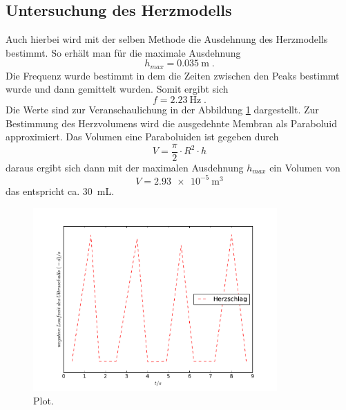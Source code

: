 \subsection{Untersuchung des Herzmodells}
Auch hierbei wird mit der selben Methode die Ausdehnung des Herzmodells
bestimmt. So erhält man für die maximale Ausdehnung
\begin{equation*}
  h_{max} = \SI{0.035}{\meter} \; .
\end{equation*}
Die Frequenz wurde bestimmt in dem die Zeiten zwischen den Peaks bestimmt wurde
und dann gemittelt wurden. Somit ergibt sich
\begin{equation*}
  f = \SI{2.23}{\hertz}\;.
\end{equation*}
Die Werte sind zur Veranschaulichung in der Abbildung \ref{fig:Hp} dargestellt.
Zur Bestimmung des Herzvolumens wird die ausgedehnte Membran als Paraboluid
approximiert. Das Volumen eine Paraboluiden ist gegeben durch
\begin{equation*}
  V = \frac{\pi}{2} \cdot R^2 \cdot h
\end{equation*}
daraus ergibt sich dann mit der maximalen Ausdehnung $h_{max}$ ein Volumen von
\begin{equation*}
  V = \SI{2.93e-5}{\cubic\meter}
\end{equation*}
das entspricht ca. \SI{30}{\milli\liter}.
\begin{figure}
  \centering
  \includegraphics[height=7cm]{plots/Herzplot.pdf}
  \caption{Plot.}
  \label{fig:Hp}
\end{figure}






















%
